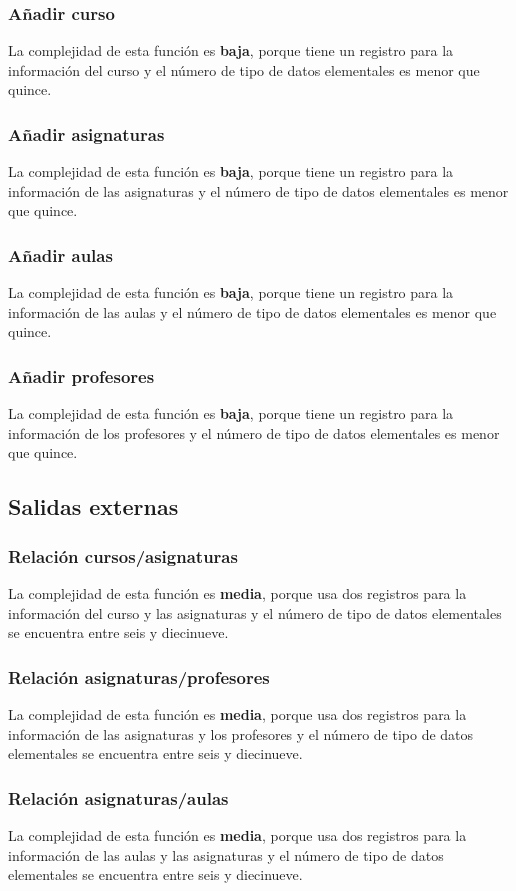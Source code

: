 \documentclass[11pt,a4paper,spanish,twoside]{book}
\begin{document}
\subsubsection{Añadir curso}
La complejidad de esta función es \textbf{baja}, porque tiene un
registro para la información del curso y el número de tipo de datos
elementales es menor que quince.
\subsubsection{Añadir asignaturas}
La complejidad de esta función es \textbf{baja}, porque tiene un
registro para la información de las asignaturas y el número de tipo de datos
elementales es menor que quince.
\subsubsection{Añadir aulas}
La complejidad de esta función es \textbf{baja}, porque tiene un
registro para la información de las aulas y el número de tipo de datos
elementales es menor que quince.
\subsubsection{Añadir profesores}
La complejidad de esta función es \textbf{baja}, porque tiene un
registro para la información de los profesores y el número de tipo de datos
elementales es menor que quince.

\subsection{Salidas externas}
\subsubsection{Relación cursos/asignaturas}
La complejidad de esta función es \textbf{media}, porque usa dos
registros para la información del curso y las asignaturas y el número de tipo
de datos elementales se encuentra entre seis y diecinueve.
\subsubsection{Relación asignaturas/profesores}
La complejidad de esta función es \textbf{media}, porque usa dos
registros para la información de las asignaturas y los profesores y el número
de tipo de datos elementales se encuentra entre seis y diecinueve. 
\subsubsection{Relación asignaturas/aulas}
La complejidad de esta función es \textbf{media}, porque usa dos
registros para la información de las aulas y las asignaturas y el número de
tipo de datos elementales se encuentra entre seis y diecinueve.
\end{document}
